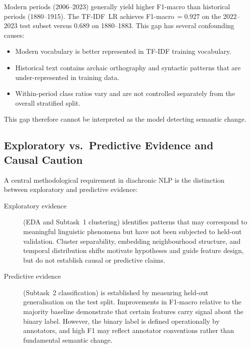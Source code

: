 Modern periods (2006--2023) generally yield higher F1-macro than historical
periods (1880--1915).  The TF-IDF~LR achieves F1-macro\,$=0.927$ on the
2022--2023 test subset versus $0.689$ on 1880--1883.  This gap has several
confounding causes:
\begin{itemize}
  \item Modern vocabulary is better represented in TF-IDF training vocabulary.
  \item Historical text contains archaic orthography and syntactic patterns
    that are under-represented in training data.
  \item Within-period class ratios vary and are not controlled separately
    from the overall stratified split.
\end{itemize}
This gap therefore cannot be interpreted as the model detecting semantic change.


\subsection{Exploratory vs.\ Predictive Evidence and Causal Caution}
\label{sec:baselines:caution}

A central methodological requirement in diachronic NLP is the distinction
between exploratory and predictive evidence:

\begin{description}
  \item[Exploratory evidence] (EDA and Subtask~1 clustering) identifies
    patterns that may correspond to meaningful linguistic phenomena but have
    not been subjected to held-out validation.  Cluster separability,
    embedding neighbourhood structure, and temporal distribution shifts
    motivate hypotheses and guide feature design, but do not establish
    causal or predictive claims.
  \item[Predictive evidence] (Subtask~2 classification) is established by
    measuring held-out generalisation on the test split.  Improvements in
    F1-macro relative to the majority baseline demonstrate that certain features
    carry signal about the binary label.  However, the binary label is defined
    operationally by annotators, and high F1 may reflect annotator conventions
    rather than fundamental semantic change.
\end{description}

